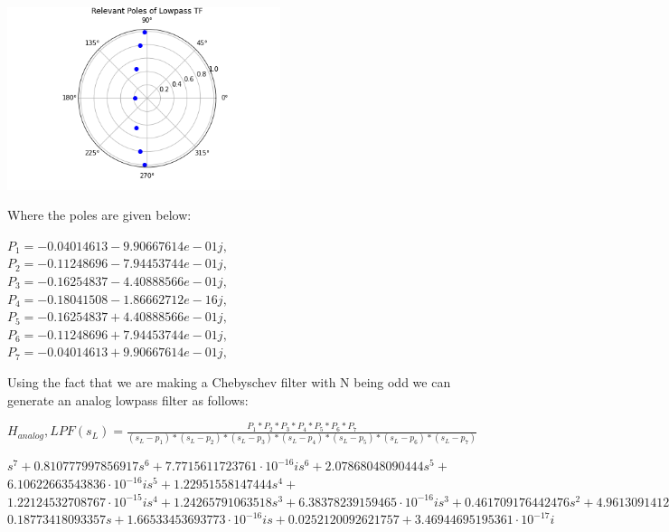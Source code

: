 \documentclass{scrartcl}
\begin{document}
\begin{center}
    
\includegraphics[width=0.6\textwidth]{Graphics/poles_lp.png}\par\vspace{2cm}

\end{center}

Where the poles are given below:

\begin{center}
$P_1 = -0.04014613-9.90667614e-01j,$\\
$P_2 = -0.11248696-7.94453744e-01j,$\\
$P_3 = -0.16254837-4.40888566e-01j,$\\
$P_4 = -0.18041508-1.86662712e-16j,$\\
$P_5 = -0.16254837+4.40888566e-01j,$\\
$P_6 = -0.11248696+7.94453744e-01j,$\\
$P_7 = -0.04014613+9.90667614e-01j,$\\ 
\end{center}

\newpage

Using the fact that we are making a Chebyschev filter with N being odd we can generate an analog lowpass filter as follows:

\begin{center}
$H_{analog},LPF (s_L) = \frac{P_1*P_2*P_3*P_4*P_5*P_6*P_7}
{(s_L - p_1)*(s_L - p_2)*(s_L - p_3)*(s_L - p_4)*(s_L - p_5)*(s_L - p_6)*(s_L - p_7)}$
\end{center}


\begin{center}
$s^{7} + 0.810777997856917 s^{6} + 7.7715611723761 \cdot 10^{-16} i s^{6} + 2.07868048090444s^{5} +$ 
\\
$6.10622663543836 \cdot 10^{-16} i s^{5} + 1.22951558147444 s^{4} +$\\
$1.22124532708767 \cdot 10^{-15} is^{4} + 1.24265791063518 s^{3} + 6.38378239159465 \cdot 10^{-16} i s^{3} + 0.461709176442476s^{2} + 4.96130914129367 \cdot 10^{-16} i s^{2} +$\\
$0.18773418093357 s + 1.66533453693773 \cdot 10^{-16} is + 0.0252120092621757 + 3.46944695195361 \cdot 10^{-17} i$
\end{center}
\end{document}
